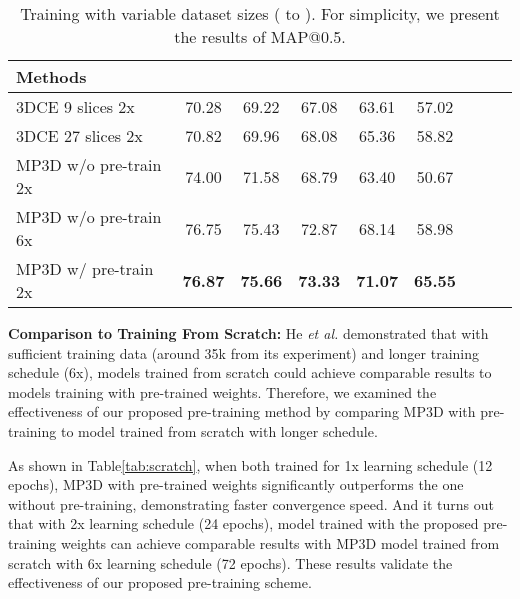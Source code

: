 \documentclass[runningheads]{llncs}
\begin{document}
\begin{table}[!t]
    \caption{Training with variable dataset sizes ( to ). For simplicity, we present the results of MAP@0.5.} \label{tab4}
    \centering
    \footnotesize \setlength{\tabcolsep}{8pt}\renewcommand{\arraystretch}{1.2}\centering
        \label{tab:datasize}
        \begin{tabular}{lcccccccc}  
            \textbf{Methods} &  &  &  &  &  \\
\hline
            \hline
            3DCE  9 slices 2x    &70.28 &69.22 &67.08 &63.61 &57.02 \\
            3DCE  27 slices 2x  &70.82 &69.96 &68.08 &65.36 &58.82 \\
            \hline
            MP3D w/o pre-train 2x       &74.00 &71.58 &68.79 &63.40 &50.67 \\ 
            MP3D w/o pre-train 6x       &76.75 &75.43 &72.87 &68.14 &58.98 \\     
            MP3D w/ pre-train 2x & \textbf{76.87}  &\textbf{75.66}  &\textbf{73.33} &\textbf{71.07}  &\textbf{65.55} \\
     
        \end{tabular}
\end{table}


\noindent\textbf{Comparison to Training From Scratch:} 
He \textit{et al.}\cite{Rethinking} demonstrated that with sufficient training data (around 35k from its experiment) and longer training schedule (6x), models trained from scratch could achieve comparable results to models training with pre-trained weights. Therefore, we examined the effectiveness of our proposed pre-training method by comparing MP3D with pre-training to model trained from scratch with longer schedule. 



As shown in Table\ref{tab:scratch}, when both trained for 1x learning schedule (12 epochs), MP3D with pre-trained weights significantly outperforms the one without pre-training, demonstrating faster convergence speed. And it turns out that with 2x learning schedule (24 epochs), model trained with the proposed pre-training weights can achieve comparable results with MP3D model trained from scratch with 6x learning schedule (72 epochs). These results validate the effectiveness of our proposed pre-training scheme.
\end{document}
